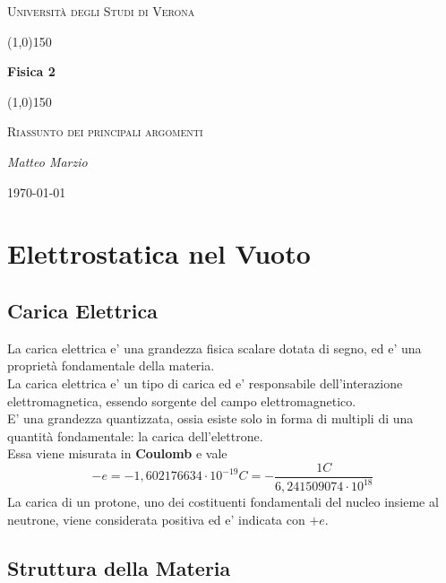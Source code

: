 \documentclass[a4paper, 10pt]{article}
\begin{document}
		\clearpage
	\begin{titlepage}
		\centering
		\vspace*{\fill}
		{\scshape\LARGE Università degli Studi di Verona \par}
		\vspace{1.5cm}
		\line(1,0){150} \\
		{\huge\bfseries Fisica 2\par}
		\line(1,0){150} \\
		\vspace{0.5cm}
		{\scshape\Large Riassunto dei principali argomenti\par}
		\vspace{2cm}
		{\Large\itshape Matteo Marzio\par}
		\vspace{1cm}
		\vspace{5cm}
		\vspace*{\fill}
		{\large \today\par}
	\end{titlepage}
	\thispagestyle{empty}
	\newpage
	\tableofcontents
	
	\newpage
	\section{Elettrostatica nel Vuoto}
		\subsection{Carica Elettrica}
			La carica elettrica e' una grandezza fisica scalare dotata di segno, ed e' una proprietà fondamentale della
			materia. \\
			La carica elettrica e' un tipo di carica ed e' responsabile dell'interazione elettromagnetica, essendo
			sorgente del campo elettromagnetico. \\
			E' una grandezza quantizzata, ossia esiste solo in forma di multipli di una quantità fondamentale: la carica
			dell'elettrone.\\ 
			Essa viene misurata in \textbf{Coulomb} e vale 
				\[ -e = -1,602176634 \cdot 10^{-19} C = - \frac{1C}{6,241509074 \cdot 10^{18}} \]
			La carica di un protone, uno dei costituenti fondamentali del nucleo insieme al neutrone, viene considerata
			positiva ed e' indicata con $+e$.
		\subsection{Struttura della Materia}
\end{document}
